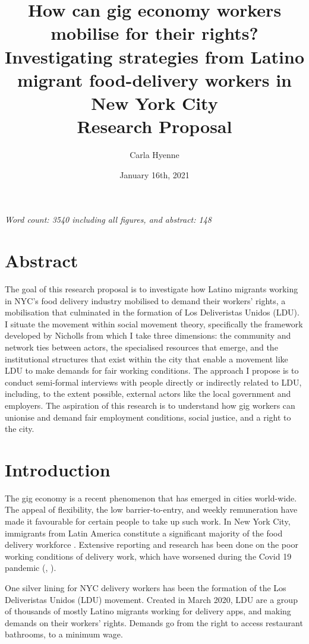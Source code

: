 \documentclass{article}[12pt]
\title{How can gig economy workers mobilise for their rights? Investigating strategies from Latino migrant food-delivery workers in New York City \\[5ex]Research Proposal \\[3ex]}
\author{Carla Hyenne}
\date{January 16th, 2021}
\begin{document}
\maketitle

\textit{Word count: 3540 including all figures, and abstract: 148}

\section{Abstract}

The goal of this research proposal is to investigate how Latino migrants working in NYC’s food delivery industry mobilised to demand their workers’ rights, a mobilisation that culminated in the formation of Los Deliveristas Unidos (LDU).
I situate the movement within social movement theory, specifically the framework developed by Nicholls from which I take three dimensions: the community and network ties between actors, the specialised resources that emerge, and the institutional structures that exist within the city that enable a movement like LDU to make demands for fair working conditions.
The approach I propose is to conduct semi-formal interviews with people directly or indirectly related to LDU, including, to the extent possible, external actors like the local government and employers.
The aspiration of this research is to understand how gig workers can unionise and demand fair employment conditions, social justice, and a right to the city.

\pagebreak

\section{Introduction}

The gig economy is a recent phenomenon that has emerged in cities world-wide. The appeal of flexibility, the low barrier-to-entry, and weekly remuneration have made it favourable for certain people to take up such work. In New York City, immigrants from Latin America constitute a significant majority of the food delivery workforce \parencite{ldu_report2021}. Extensive reporting and research has been done on the poor working conditions of delivery work, which have worsened during the Covid 19 pandemic (\parencite{newyorker2020uncertain}, \parencite{nytimes2021risk}).

One silver lining for NYC delivery workers has been the formation of the Los Deliveristas Unidos (LDU) movement. Created in March 2020, LDU are a group of thousands of mostly Latino migrants working for delivery apps, and making demands on their workers’ rights. Demands go from the right to access restaurant bathrooms, to a minimum wage. 
\end{document}
